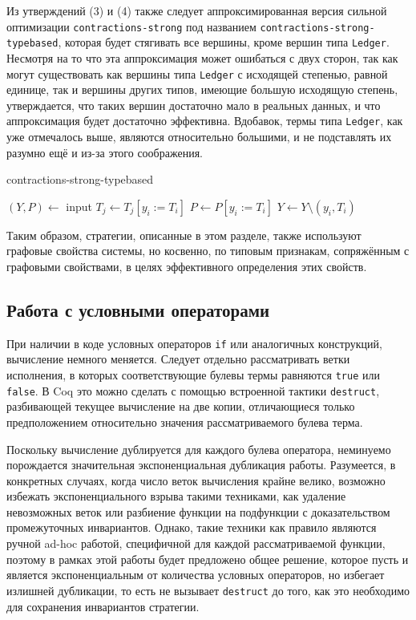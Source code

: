 \documentclass[../thesis.tex]{subfiles}
\begin{document}
Из утверждений (3) и (4) также следует аппроксимированная версия сильной оптимизации \texttt{contractions-strong} под названием \texttt{contractions-strong-typebased}, которая будет стягивать все вершины, кроме вершин типа \texttt{Ledger}. Несмотря на то что эта аппроксимация может ошибаться с двух сторон, так как могут существовать как вершины типа \texttt{Ledger} с исходящей степенью, равной единице, так и вершины других типов, имеющие большую исходящую степень, утверждается, что таких вершин достаточно мало в реальных данных, и что аппроксимация будет достаточно эффективна. Вдобавок, термы типа \texttt{Ledger}, как уже отмечалось выше, являются относительно большими, и не подставлять их разумно ещё и из-за этого соображения.

\begin{megaalgorithm}
    \caption{contractions-strong-typebased}
  \begin{algorithmic}
    \State $(Y, P)\gets$ input
        \If{\textcolor{red}{$typeof(y_i)$ is not $Ledger$}}
                \State $T_j \gets T_j [y_i := T_i]$
            \EndFor
            \State $P \gets P [y_i := T_i]$
            \State $Y\gets Y \setminus (y_i, T_i)$
        \EndIf
    \EndFor
    \State {}
  \end{algorithmic}
\end{megaalgorithm}

Таким образом, стратегии, описанные в этом разделе, также используют графовые свойства системы, но косвенно, по типовым признакам, сопряжённым с графовыми свойствами, в целях эффективного определения этих свойств. 

\subsection{Работа с условными операторами}\label{ifs}

При наличии в коде условных операторов \texttt{if} или аналогичных конструкций, вычисление немного меняется. Следует отдельно рассматривать ветки исполнения, в которых соответствующие булевы термы равняются \texttt{true} или \texttt{false}. В Coq это можно сделать с помощью встроенной тактики \texttt{destruct}, разбивающей текущее вычисление на две копии, отличающиеся только предположением относительно значения рассматриваемого булева терма.

Поскольку вычисление дублируется для каждого булева оператора, неминуемо порождается значительная экспоненциальная дубликация работы. Разумеется, в конкретных случаях, когда число веток вычисления крайне велико, возможно избежать экспоненциального взрыва такими техниками, как удаление невозможных веток или разбиение функции на подфункции с доказательством промежуточных инвариантов. Однако, такие техники как правило являются ручной ad-hoc работой, специфичной для каждой рассматриваемой функции, поэтому в рамках этой работы будет предложено общее решение, которое пусть и является экспоненциальным от количества условных операторов, но избегает излишней дубликации, то есть не вызывает \texttt{destruct} до того, как это необходимо для сохранения инвариантов стратегии.
\end{document}
